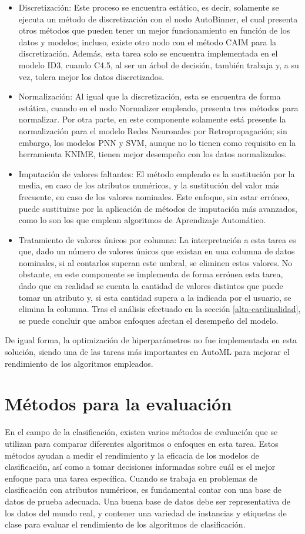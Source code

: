  \begin{itemize}
 	\item Discretización: Este proceso se encuentra estático, es decir, solamente se ejecuta un método de discretización con el nodo AutoBinner, el cual presenta otros métodos que pueden tener un mejor funcionamiento en función de los datos y modelos; incluso, existe otro nodo con el método CAIM para la discretización. Además, esta tarea solo se encuentra implementada en el modelo ID3, cuando C4.5, al ser un árbol de decisión, también trabaja y, a su vez, tolera mejor los datos discretizados.
 	\item Normalización: Al igual que la discretización, esta se encuentra de forma estática, cuando en el nodo Normalizer empleado, presenta tres métodos para normalizar. Por otra parte, en este componente solamente está presente la normalización para el modelo Redes Neuronales por Retropropagación; sin embargo, los modelos PNN y SVM, aunque no lo tienen como requisito en la herramienta KNIME, tienen mejor desempeño con los datos normalizados.
 	\item Imputación de valores faltantes: El método empleado es la sustitución por la media, en caso de los atributos numéricos, y la sustitución del valor más frecuente, en caso de los valores nominales. Este enfoque, sin estar erróneo, puede sustituirse por la aplicación de métodos de imputación más avanzados, como lo son los que emplean algoritmos de Aprendizaje Automático.
 	\item Tratamiento de valores únicos por columna: La interpretación a esta tarea es que, dado un número de valores únicos que existan en una columna de datos nominales, si al contarlos superan este umbral, se eliminen estos valores. No obstante, en este componente se implementa de forma errónea esta tarea, dado que en realidad se cuenta la cantidad de valores distintos que puede tomar un atributo y, si esta cantidad supera a la indicada por el usuario, se elimina la columna. Tras el análisis efectuado en la sección \ref{alta-cardinalidad}, se puede concluir que ambos enfoques afectan el desempeño del modelo.
 \end{itemize}
De igual forma, la optimización de hiperparámetros no fue implementada en esta solución, siendo una de las tareas más importantes en AutoML para mejorar el rendimiento de los algoritmos empleados. 

\section{Métodos para la evaluación}
En el campo de la clasificación, existen varios métodos de evaluación que se utilizan para comparar diferentes algoritmos o enfoques en esta tarea. Estos métodos ayudan a medir el rendimiento y la eficacia de los modelos de clasificación, así como a tomar decisiones informadas sobre cuál es el mejor enfoque para una tarea específica. Cuando se trabaja en problemas de clasificación con atributos numéricos, es fundamental contar con una base de datos de prueba adecuada. Una buena base de datos debe ser representativa de los datos del mundo real, y contener una variedad de instancias y etiquetas de clase para evaluar el rendimiento de los algoritmos de clasificación.

